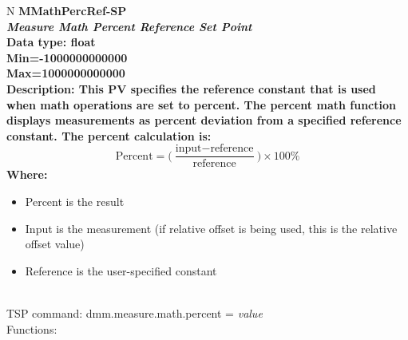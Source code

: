 \documentclass[openany]{article}
\begin{document}
		\begin{tabular}{N}
			\hline
			\bfseries MMathPercRef-SP\label{pv:mmathpercref-sp} \\ \hline
			\emph{Measure Math Percent Reference Set Point} \\
			Data type: float \\
			Min=-1000000000000 \\
			Max=1000000000000 \\
			Description: This PV specifies the reference constant that is used when math operations are set to percent. The percent math function displays measurements as percent deviation from a specified reference constant. The percent calculation is: $$ \text{Percent} = \bigg(\frac{\text{input} - \text{reference}}{\text{reference}}\bigg)\times 100\% $$ Where: \begin{itemize} \item Percent is the result
\item Input is the measurement (if relative offset is being used, this is the relative offset value) \item Reference is the user-specified constant \end{itemize} \\
			TSP command: dmm.measure.math.percent = \emph{value} \\
			Functions: \\
			\arrayrulecolor{\FuncTableBorderColor}

		\end{tabular}
\end{document}
